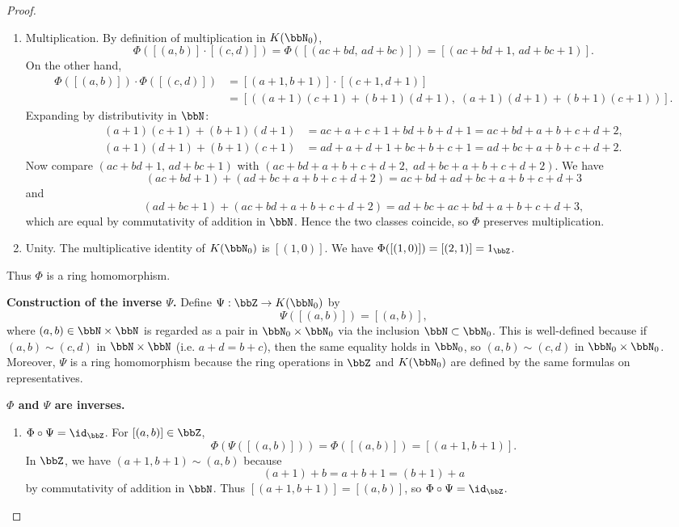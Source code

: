 \begin{proof}
\begin{enumerate}
        \item Multiplication. By definition of multiplication in $K(\bbN_0)$,
        $$\Phi([(a,b)] \cdot [(c,d)]) = \Phi([(ac+bd,\, ad+bc)]) = [(ac+bd+1,\, ad+bc+1)].$$
        On the other hand,
        \begin{align*}
        \Phi([(a,b)]) \cdot \Phi([(c,d)]) &= [(a+1,b+1)] \cdot [(c+1,d+1)] \\
        &= [((a+1)(c+1)+(b+1)(d+1),\; (a+1)(d+1)+(b+1)(c+1))].
        \end{align*}
        Expanding by distributivity in $\bbN$:
        \begin{align*}
        (a+1)(c+1)+(b+1)(d+1) &= ac+a+c+1+bd+b+d+1 = ac+bd + a+b+c+d+2, \\
        (a+1)(d+1)+(b+1)(c+1) &= ad+a+d+1+bc+b+c+1 = ad+bc + a+b+c+d+2.
        \end{align*}
        Now compare $(ac+bd+1,\, ad+bc+1)$ with $(ac+bd+a+b+c+d+2,\; ad+bc+a+b+c+d+2)$. We have
        $$(ac+bd+1) + (ad+bc+a+b+c+d+2) = ac+bd+ad+bc + a+b+c+d+3$$
        and
        $$(ad+bc+1) + (ac+bd+a+b+c+d+2) = ad+bc+ac+bd + a+b+c+d+3,$$
        which are equal by commutativity of addition in $\bbN$. Hence the two classes coincide, so $\Phi$ preserves multiplication.

        \item Unity. The multiplicative identity of $K(\bbN_0)$ is $[(1,0)]$. We have $\Phi([(1,0)]) = [(2,1)] = 1_\bbZ$.
    \end{enumerate}
    Thus $\Phi$ is a ring homomorphism.

    \textbf{Construction of the inverse $\Psi$.} Define $\Psi: \bbZ \to K(\bbN_0)$ by
    $$\Psi([(a,b)]) = [(a,b)],$$
    where $(a,b) \in \bbN \times \bbN$ is regarded as a pair in $\bbN_0 \times \bbN_0$ via the inclusion $\bbN \subset \bbN_0$. This is well-defined because if $(a,b) \sim (c,d)$ in $\bbN \times \bbN$ (i.e. $a+d = b+c$), then the same equality holds in $\bbN_0$, so $(a,b) \sim (c,d)$ in $\bbN_0 \times \bbN_0$. Moreover, $\Psi$ is a ring homomorphism because the ring operations in $\bbZ$ and $K(\bbN_0)$ are defined by the same formulas on representatives.

    \textbf{$\Phi$ and $\Psi$ are inverses.}
    \begin{enumerate}
        \item $\Phi \circ \Psi = \id_\bbZ$. For $[(a,b)] \in \bbZ$,
        $$\Phi(\Psi([(a,b)])) = \Phi([(a,b)]) = [(a+1,b+1)].$$
        In $\bbZ$, we have $(a+1,b+1) \sim (a,b)$ because
        $$(a+1) + b = a + b + 1 = (b+1) + a$$
        by commutativity of addition in $\bbN$. Thus $[(a+1,b+1)] = [(a,b)]$, so $\Phi \circ \Psi = \id_\bbZ$.


\end{enumerate}
\end{proof}
